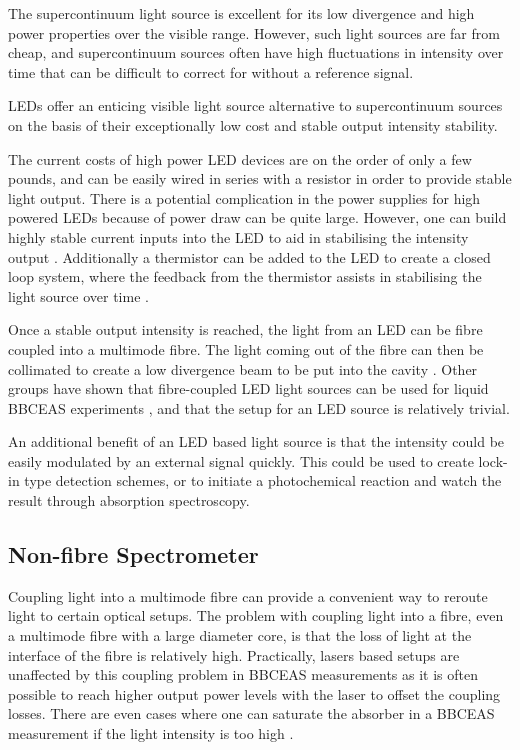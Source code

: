 
The supercontinuum light source is excellent for its low divergence and high
power properties over the visible range. However, such light sources are far
from cheap, and supercontinuum sources often have high fluctuations in
intensity over time that can be difficult to correct for without a reference
signal.

\acp{LED} offer an enticing visible light source alternative to supercontinuum
sources on the basis of their exceptionally low cost and stable output
intensity stability.

The current costs of high power \ac{LED} devices are on the order of only a few
pounds, and can be easily wired in series with a resistor in order to provide
stable light output. There is a potential complication in the power supplies
for high powered \acp{LED} because of power draw can be quite large.  However,
one can build highly stable current inputs into the \ac{LED} to aid in
stabilising the intensity output \cite{patent_const_current}. Additionally a
thermistor can be added to the \ac{LED} to create a closed loop system, where
the feedback from the thermistor assists in stabilising the light source over
time \cite{Wieman:2000vd}.

Once a stable output intensity is reached, the light from an \ac{LED} can be
fibre coupled into a multimode fibre. The light coming out of the fibre can
then be collimated to create a low divergence beam to be put into the cavity
\cite{Berden:2009wk}.  Other groups have shown that fibre-coupled \ac{LED}
light sources can be used for liquid \ac{BBCEAS} experiments
\cite{Islam:2007ea,Seetohul:2009du}, and that the setup for an \ac{LED} source
is relatively trivial.

An additional benefit of an \ac{LED} based light source is that the intensity
could be easily modulated by an external signal quickly. This could be used to
create lock-in type detection schemes, or to initiate a photochemical reaction
and watch the result through absorption spectroscopy.



\subsection{Non-fibre Spectrometer}\label{subsec:bbceas_no_fibre}

Coupling light into a multimode fibre can provide a convenient way to reroute
light to certain optical setups. The problem with coupling light into a fibre,
even a multimode fibre with a large diameter core, is that the loss of light at
the interface of the fibre is relatively high. Practically, lasers based setups
are unaffected by this coupling problem in \ac{BBCEAS} measurements as it is
often possible to reach higher output power levels with the laser to offset the
coupling losses.  There are even cases where one can saturate the absorber in a
\ac{BBCEAS} measurement if the light intensity is too high
\cite{Giuliano:1967hw}.

